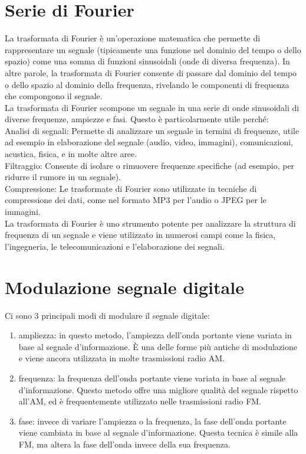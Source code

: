 \documentclass[12pt,oneside,a4paper]{article}
\begin{document}
\section{Serie di Fourier}
La trasformata di Fourier è un'operazione matematica che permette di rappresentare un segnale (tipicamente una funzione nel dominio del tempo o dello spazio) come una somma di funzioni sinusoidali (onde di diversa frequenza). In altre parole, la trasformata di Fourier consente di passare dal dominio del tempo o dello spazio al dominio della frequenza, rivelando le componenti di frequenza che compongono il segnale.\\
La trasformata di Fourier scompone un segnale in una serie di onde sinusoidali di diverse frequenze, ampiezze e fasi. Questo è particolarmente utile perché:\\
Analisi di segnali: Permette di analizzare un segnale in termini di frequenze, utile ad esempio in elaborazione del segnale (audio, video, immagini), comunicazioni, acustica, fisica, e in molte altre aree.\\
Filtraggio: Consente di isolare o rimuovere frequenze specifiche (ad esempio, per ridurre il rumore in un segnale).\\
Compressione: Le trasformate di Fourier sono utilizzate in tecniche di compressione dei dati, come nel formato MP3 per l'audio o JPEG per le immagini.\\
La trasformata di Fourier è uno strumento potente per analizzare la struttura di frequenza di un segnale e viene utilizzato in numerosi campi come la fisica, l'ingegneria, le telecomunicazioni e l'elaborazione dei segnali.
\section{Modulazione segnale digitale}
Ci sono 3 principali modi di modulare il segnale digitale:
\begin{enumerate}
\item ampliezza: in questo metodo, l’ampiezza dell’onda portante viene variata in base al segnale d’informazione. È una delle forme più antiche di modulazione e viene ancora utilizzata in molte trasmissioni radio AM.
\item frequenza: la frequenza dell’onda portante viene variata in base al segnale d’informazione. Questo metodo offre una migliore qualità del segnale rispetto all’AM, ed è frequentemente utilizzato nelle trasmissioni radio FM.
\item fase: invece di variare l’ampiezza o la frequenza, la fase dell’onda portante viene cambiata in base al segnale d’informazione. Questa tecnica è simile alla FM, ma altera la fase dell’onda invece della sua frequenza.
\end{enumerate}
\end{document}

